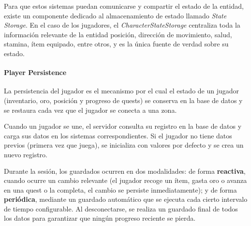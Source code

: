 \vspace{0.25cm}

Para que estos sistemas puedan comunicarse y compartir el estado de la entidad, existe un componente dedicado al almacenamiento de estado llamado
\textit{State Storage}. En el caso de los jugadores, el \textit{CharacterStateStorage} centraliza toda la información relevante de la entidad
posición, dirección de movimiento, salud, stamina, ítem equipado, entre otros, y es la única fuente de verdad sobre su estado.

\paragraph{Player Persistence}
La persistencia del jugador es el mecanismo por el cual el estado de un jugador (inventario, oro, posición y progreso de quests) se conserva
en la base de datos y se restaura cada vez que el jugador se conecta a una zona.

\vspace{0.25cm}

Cuando un jugador se une, el servidor consulta su registro en la base de datos y carga sus datos en los sistemas correspondientes. Si el
jugador no tiene datos previos (primera vez que juega), se inicializa con valores por defecto y se crea un nuevo registro.

\vspace{0.25cm}

Durante la sesión, los guardados ocurren en dos modalidades: de forma \textbf{reactiva}, cuando ocurre un cambio relevante (el jugador recoge un ítem,
gasta oro o avanza en una quest o la completa, el cambio se persiste inmediatamente); y de forma \textbf{periódica}, mediante un guardado automático que se ejecuta
cada cierto intervalo de tiempo configurable. Al desconectarse, se realiza un guardado final de todos los datos para garantizar que ningún
progreso reciente se pierda.

